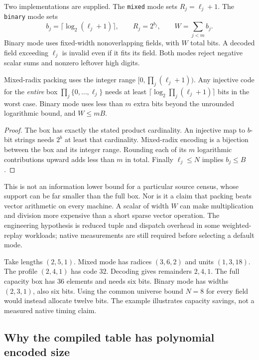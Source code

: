 Two implementations are supplied. The \texttt{mixed} mode sets
$R_j=\ell_j+1$. The \texttt{binary} mode sets
\[
 b_j=\lceil\log_2(\ell_j+1)\rceil,
 \qquad R_j=2^{b_j},\qquad W=\sum_{j<m}b_j.
\]
Binary mode uses fixed-width nonoverlapping fields, with $W$ total bits.
A decoded field exceeding $\ell_j$ is invalid even if it fits its field.
Both modes reject negative scalar sums and nonzero leftover high digits.

\begin{proposition}
\label{prop:width}
Mixed-radix packing uses the integer range
$[0,\prod_j(\ell_j+1))$. Any injective code for the \emph{entire} box
$\prod_j\{0,\ldots,\ell_j\}$ needs at least
$\lceil\log_2\prod_j(\ell_j+1)\rceil$ bits in the worst case. Binary mode
uses less than $m$ extra bits beyond the unrounded logarithmic bound, and
$W\le mB$.
\end{proposition}

\begin{proof}
The box has exactly the stated product cardinality. An injective map to
$b$-bit strings needs $2^b$ at least that cardinality. Mixed-radix encoding
is a bijection between the box and its integer range. Rounding each of its
$m$ logarithmic contributions upward adds less than $m$ in total. Finally
$\ell_j\le N$ implies $b_j\le B$.
\end{proof}

This is not an information lower bound for a particular source census,
whose support can be far smaller than the full box. Nor is it a claim that
packing beats vector arithmetic on every machine. A scalar of width $W$
can make multiplication and division more expensive than a short sparse
vector operation. The engineering hypothesis is reduced tuple and dispatch
overhead in some weighted-replay workloads; native measurements are still
required before selecting a default mode.

\begin{example}
Take lengths $(2,5,1)$. Mixed mode has radices $(3,6,2)$ and units $(1,3,18)$.
The profile $(2,4,1)$ has code $32$. Decoding gives remainders $2,4,1$.
The full capacity box has $36$ elements and needs six bits. Binary mode has
widths $(2,3,1)$, also six bits. Using the common universe bound $N=8$ for
every field would instead allocate twelve bits. The example illustrates
capacity savings, not a measured native timing claim.
\end{example}

\subsection{Why the compiled table has polynomial encoded size}

